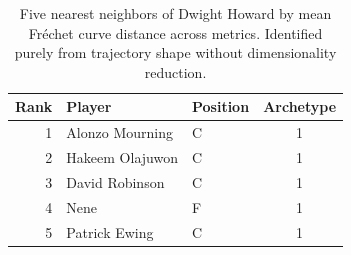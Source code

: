 \begin{table}[htbp]
  \centering\small
  \begin{tabular}{rllc}
    \toprule
    Rank & Player & Position & Archetype \\
    \midrule
    1 & Alonzo Mourning & C & 1 \\
    2 & Hakeem Olajuwon & C & 1 \\
    3 & David Robinson & C & 1 \\
    4 & Nene & F & 1 \\
    5 & Patrick Ewing & C & 1 \\
    \bottomrule
  \end{tabular}
  \caption{Five nearest neighbors of Dwight Howard by mean Fr\'{e}chet curve distance across metrics. Identified purely from trajectory shape without dimensionality reduction.}
  \label{tab:Dwight_Howard_frechet_curve_neighbors}
\end{table}

